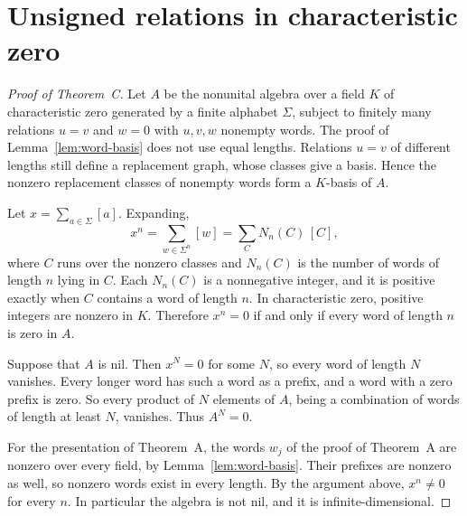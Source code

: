 \section{Unsigned relations in characteristic zero}\label{sec:charzero}

\begin{proof}[Proof of Theorem~C]
Let $A$ be the nonunital algebra over a field $K$ of characteristic zero generated by a finite alphabet $\Sigma$, subject
to finitely many relations $u=v$ and $w=0$ with $u,v,w$ nonempty words. The proof of Lemma~\ref{lem:word-basis} does not
use equal lengths. Relations $u=v$ of different lengths still define a replacement graph, whose classes give a basis.
Hence the nonzero replacement classes of nonempty words form a $K$-basis of $A$.

Let $x=\sum_{a\in\Sigma}[a]$. Expanding,
\[
 x^n=\sum_{w\in\Sigma^n}[w]=\sum_{C}N_n(C)\,[C],
\]
where $C$ runs over the nonzero classes and $N_n(C)$ is the number of words of length $n$ lying in $C$. Each $N_n(C)$ is
a nonnegative integer, and it is positive exactly when $C$ contains a word of length $n$. In characteristic zero, positive
integers are nonzero in $K$. Therefore $x^n=0$ if and only if every word of length $n$ is zero in $A$.

Suppose that $A$ is nil. Then $x^N=0$ for some $N$, so every word of length $N$ vanishes. Every longer word has such a
word as a prefix, and a word with a zero prefix is zero. So every product of $N$ elements of $A$, being a combination of
words of length at least $N$, vanishes. Thus $A^N=0$.

For the presentation of Theorem~A, the words $w_j$ of the proof of Theorem~A are nonzero over every field, by
Lemma~\ref{lem:word-basis}. Their prefixes are nonzero as well, so nonzero words exist in every length. By the argument
above, $x^n\neq0$ for every $n$. In particular the algebra is not nil, and it is infinite-dimensional.
\end{proof}

